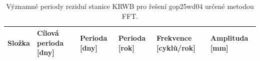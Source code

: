 \begin{table}[htbp]
\caption{Významné periody reziduí stanice KRWB pro řešení gop25wd04 určené metodou FFT.}
\label{tab:gop25wd04_stcd_krwb_detr_weighted_1seg_spectral_fft_significant_periods}
\begin{tabular}{llllll}
\toprule
Složka & Cílová perioda [dny] & Perioda [dny] & Perioda [rok] & Frekvence [cyklů/rok] & Amplituda [mm] \\
\midrule
\bottomrule
\end{tabular}
\end{table}
